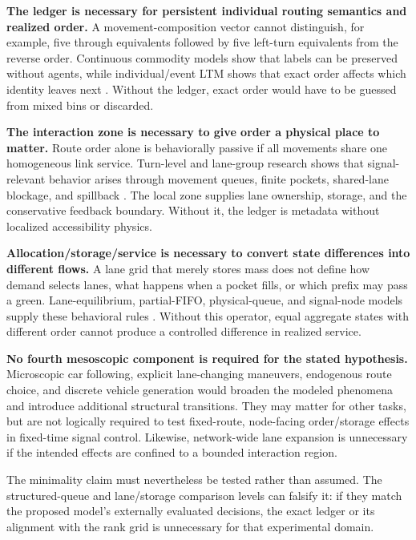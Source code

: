 \documentclass[11pt,a4paper]{article}
\begin{document}
\textbf{The ledger is necessary for persistent individual routing semantics and realized order.} A movement-composition vector cannot distinguish, for example, five through equivalents followed by five left-turn equivalents from the reverse order. Continuous commodity models show that labels can be preserved without agents, while individual/event LTM shows that exact order affects which identity leaves next \cite{wright2015lnctm,desouza2025}. Without the ledger, exact order would have to be guessed from mixed bins or discarded.

\textbf{The interaction zone is necessary to give order a physical place to matter.} Route order alone is behaviorally passive if all movements share one homogeneous link service. Turn-level and lane-group research shows that signal-relevant behavior arises through movement queues, finite pockets, shared-lane blockage, and spillback \cite{wei2025,liu2011,gao2012}. The local zone supplies lane ownership, storage, and the conservative feedback boundary. Without it, the ledger is metadata without localized accessibility physics.

\textbf{Allocation/storage/service is necessary to convert state differences into different flows.} A lane grid that merely stores mass does not define how demand selects lanes, what happens when a pocket fills, or which prefix may pass a green. Lane-equilibrium, partial-FIFO, physical-queue, and signal-node models supply these behavioral rules \cite{gong2025,wright2017,gao2012,yahya2023}. Without this operator, equal aggregate states with different order cannot produce a controlled difference in realized service.

\textbf{No fourth mesoscopic component is required for the stated hypothesis.} Microscopic car following, explicit lane-changing maneuvers, endogenous route choice, and discrete vehicle generation would broaden the modeled phenomena and introduce additional structural transitions. They may matter for other tasks, but are not logically required to test fixed-route, node-facing order/storage effects in fixed-time signal control. Likewise, network-wide lane expansion is unnecessary if the intended effects are confined to a bounded interaction region.

The minimality claim must nevertheless be tested rather than assumed. The structured-queue and lane/storage comparison levels can falsify it: if they match the proposed model's externally evaluated decisions, the exact ledger or its alignment with the rank grid is unnecessary for that experimental domain.
\end{document}
